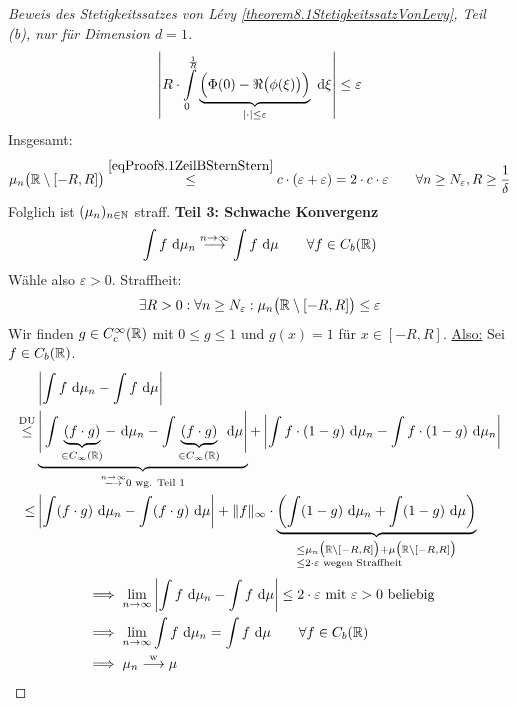 \begin{proof}[Beweis des Stetigkeitssatzes von Lévy \ref{theorem8.1StetigkeitssatzVonLevy}, Teil (b), nur für Dimension $d=1$]
\begin{align*}
		\left|R\cdot\int\limits_0^{\frac{1}{R}}\underbrace{\Big(\Phi(0)-\Re\big(\phi(\xi)\big)\Big)}_{|\cdot|\leq\varepsilon}\text{ d}\xi\right|\leq\varepsilon
	\end{align*}
	Insgesamt:
	\begin{align*}
		\mu_n\big(\mathbb{R}\setminus[-R,R]\big)
		\overset{\eqref{eqProof8.1ZeilBSternStern}}{\leq}
		c\cdot(\varepsilon+\varepsilon)
		=2\cdot c\cdot\varepsilon
		\qquad\forall n\geq N_\varepsilon,R\geq\frac{1}{\delta}
	\end{align*}
	Folglich ist $(\mu_n)_{n\in\mathbb{N}}$ straff.\nl
	\textbf{Teil 3: Schwache Konvergenz}
	\begin{align*}
		\int\limits f\text{ d}\mu_n\overset{n\to\infty}{\longrightarrow}\int\limits f\text{ d}\mu\qquad\forall f\in C_b(\mathbb{R})
	\end{align*}
	Wähle also $\varepsilon>0$. Straffheit:
	\begin{align*}
		\exists R>0:\forall n\geq N_\varepsilon:\mu_n\big(\mathbb{R}\setminus[-R,R]\big)\leq\varepsilon
	\end{align*}
	Wir finden $g\in C_c^\infty(\mathbb{R})$ mit $0\leq g\leq 1$ und $g(x)=1$ für $x\in[-R,R]$.
	\underline{Also:} Sei $f\in C_b(\mathbb{R})$.
	\begin{align*}
		&\left|\int\limits f\text{ d}\mu_n-\int\limits f\text{ d}\mu\right|\\
		\overset{\text{DU}}{\leq}&
		\underbrace{\Bigg|\int\limits \underbrace{(f\cdot g)}_{\in C_\infty(\mathbb{R})}-\text{ d}\mu_n-\int\limits\underbrace{(f\cdot g)}_{\in C_\infty(\mathbb{R})}\text{ d}\mu\Bigg|}_{\overset{n\to\infty}{\longrightarrow}0\text{ wg. Teil 1}}
		+\left|\int\limits f\cdot(1-g)\text{ d}\mu_n-\int\limits f\cdot(1- g)\text{ d}\mu_n\right|\\
		\leq&\left|\int\limits (f\cdot g)\text{ d}\mu_n-\int\limits(f\cdot g)\text{ d}\mu\right|
		+\Vert f\Vert_\infty\cdot\underbrace{\left(\int\limits(1-g)\text{ d}\mu_n+\int\limits(1-g)\text{ d}\mu\right)}_{
			\begin{subarray}{l}
				\leq\mu_n\big(\mathbb{R}\setminus[-R,R]\big)+\mu\big(\mathbb{R}\setminus[-R,R]\big)\\
				\leq 2\cdot\varepsilon\text{ wegen Straffheit}
			\end{subarray}
		}
	\end{align*}
	\begin{align*}
		&\implies\lim\limits_{n\to\infty}\left|\int\limits f\text{ d}\mu_n-\int\limits f\text{ d}\mu\right|\leq 2\cdot\varepsilon \text{ mit } \varepsilon>0 \text{ beliebig}\\
		&\implies\lim\limits_{n\to\infty}\int\limits f\text{ d}\mu_n=\int\limits f\text{ d}\mu\qquad\forall f\in C_b(\mathbb{R})\\
		&\implies\mu_n\overset{\text{w}}{\longrightarrow}\mu
	\end{align*}
\end{proof}

